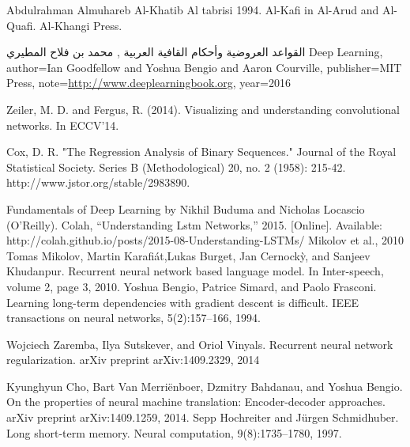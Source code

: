 \makeatletter
\renewcommand{\ps@plain}{%
\renewcommand\@oddhead{\hfil\normalfont\textrm{\thepage}}%
\renewcommand\@evenhead{}%
\renewcommand\@oddfoot{}%
\renewcommand\@evenfoot{}%
}
\makeatother
\pagestyle{myheadings}
\renewcommand\bibname{\uppercase{References}}
\begin{thebibliography}{999}
Abdulrahman Almuhareb
 Al-Khatib Al tabrisi 1994. Al-Kafi in Al-Arud and Al-Quafi. Al-Khangi Press.
 

    
 القواعد العروضية وأحكام القافية العربية , محمد بن فلاح المطيري
 Deep Learning,
    author={Ian Goodfellow and Yoshua Bengio and Aaron Courville},
    publisher={MIT Press},
    note={\url{http://www.deeplearningbook.org}},
    year={2016}

     Zeiler, M. D. and Fergus, R. (2014). Visualizing and understanding convolutional networks. In ECCV’14.

       Cox, D. R. "The Regression Analysis of Binary Sequences." Journal of the Royal Statistical Society. Series B (Methodological) 20, no. 2 (1958): 215-42. http://www.jstor.org/stable/2983890.

Fundamentals of Deep Learning by Nikhil Buduma and Nicholas Locascio (O’Reilly).
 Colah, “Understanding Lstm Networks,” 2015. [Online]. Available: http://colah.github.io/posts/2015-08-Understanding-LSTMs/
 Mikolov et al., 2010 Tomas Mikolov, Martin Karafiát,Lukas Burget, Jan Cernockỳ, and Sanjeev Khudanpur. Recurrent neural network based language model. In Inter-speech, volume 2, page 3, 2010.
 Yoshua Bengio, Patrice Simard, and Paolo Frasconi. Learning long-term dependencies with gradient descent is difficult. IEEE transactions on neural networks, 5(2):157–166, 1994.

 Wojciech Zaremba, Ilya Sutskever, and Oriol Vinyals. Recurrent neural network regularization. arXiv preprint arXiv:1409.2329, 2014

 Kyunghyun Cho, Bart Van Merriënboer, Dzmitry Bahdanau, and Yoshua Bengio. On the properties of neural machine translation: Encoder-decoder approaches. arXiv preprint arXiv:1409.1259, 2014.
 Sepp Hochreiter and Jürgen Schmidhuber. Long short-term memory. Neural computation, 9(8):1735–1780, 1997.


\end{thebibliography}
